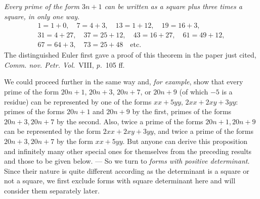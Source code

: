 \textit{Every prime of the form $3n+1$ can be written as a square plus three times a square, in only one way.}
\[
\begin{gathered}
1=1+0,\quad7=4+3,\quad13=1+12,\quad19=16+3,\\
31=4+27,\quad37=25+12,\quad43=16+27,\quad61=49+12,\\
67=64+3,\quad73=25+48\quad\text{etc.}
\end{gathered}
\]
The distinguished Euler first gave a proof of this theorem in the paper just cited, \textit{Comm. nov. Petr. Vol.}\ VIII, \textit{p.}\ 105 ff.

We could proceed further in the same way and, \textit{for example}, show that every prime of the form $20n+1$, $20n+3$, $20n+7$, or $20n+9$ (of which $-5$ is a residue) can be represented by one of the forms $xx+5yy$, $2xx+2xy+3yy$: primes of the forms $20n+1$ and $20n+9$ by the first, primes of the forms $20n+3,20n+7$ by the second. Also, twice a prime of the forms $20n+1,20n+9$ can be represented by the form $2xx+2xy+3yy$, and twice a prime of the forms $20n+3,20n+7$ by the form $xx+5yy$. But anyone can derive this proposition and infinitely many other special ones for themselves from the preceding results and those to be given
below. --- So we turn to \textit{forms with positive determinant}. Since their nature is quite different according as the determinant is a square or not a square, we first exclude forms with square determinant here and will consider them separately later.
